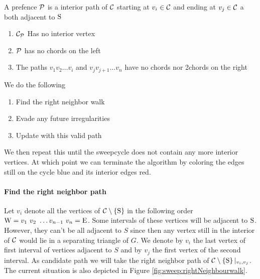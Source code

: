   \begin{defi}[Prefence]
    A prefence $\P$ is a interior path of $\C$ starting at $v_i \in \C$ and ending at $v_j \in \C$ a both adjacent to $\pS$
    \begin{enumerate}
      \itemsep=-4pt
      \renewcommand*{\labelenumi}{(P\arabic{enumi})}%
      \renewcommand*{\theenumi}{(P\arabic{enumi})}%

      \item  $\C_\P$ Has no interior vertex
      \label{p:noInteriorVertex}
      \item  $\P$ has no chords on the left     \label{p:Wchordfree}
      \item  The paths $v_1 v_2 \ldots v_i$ and $v_j v_{j+1} \ldots v_n$ have no chords nor 2chords on the right     \label{p:Cchordfree}
    \end{enumerate}
  \end{defi}

  We do the following
  \begin{enumerate}
    \itemsep=-4pt
    \item Find the right neighbor walk
    \item Evade any future irregularities
    \item Update with this valid path
  \end{enumerate}

  We then repeat this until the sweepcycle does not contain any more interior vertices. At which point we can terminate the algorithm by coloring the edges still on the cycle blue and its interior edges red.

  \paragraph{Find the right neighbor path}
    Let $v_i$ denote all the vertices of $\cpath$ in the following order $\pW =  v_1 \  v_2 \  \ldots v_{n-1} \  v_n = \pE$.
    Some intervals of these vertices will be adjacent to $\pS$. However, they can't be all adjacent to $S$ since then any vertex still in the interior of $\C$ would lie in a separating triangle of $G$. We denote by $v_i$ the last vertex of first interval of vertices adjacent to $S$ and by $v_j$ the first vertex of the second interval.
    As candidate path we will take the right neighbor path of $\cpath|_{v_i, v_j}$.
    The current situation is also depicted in Figure \ref{fig:sweep:rightNeighbourwalk}.

